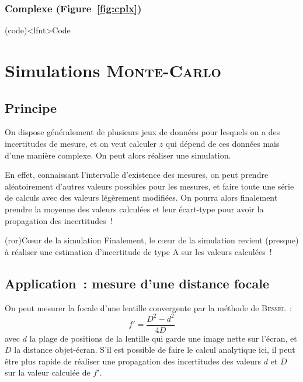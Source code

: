\documentclass[a4paper, 12pt, garamond]{book}
\begin{document}
\subsubsection{Complexe (Figure~\ref{fig:cplx})}
\begin{tcb}[breakable](code)<lfnt>{Code}
\end{tcb}

\section{Simulations \textsc{Monte-Carlo}}
\subsection{Principe}
On dispose généralement de plusieurs jeux de données pour
lesquels on a des incertitudes de mesure, et on veut calculer $z$ qui dépend de
ces données mais d'une manière complexe. On peut alors réaliser une simulation.

En effet, connaissant l'intervalle d'existence des mesures, on peut prendre
aléatoirement d'autres valeurs possibles pour les mesures, et faire toute une
série de calculs avec des valeurs légèrement modifiées. On pourra alors
finalement prendre la moyenne des valeurs calculées et leur écart-type pour
avoir la propagation des incertitudes~!

\begin{tcb}(ror){Cœur de la simulation}
	Finalement, le cœur de la simulation revient (presque) à réaliser une estimation
	d'incertitude de type A sur les valeurs calculées~!
\end{tcb}

\subsection{Application~: mesure d'une distance focale}
On peut mesurer la focale d'une lentille convergente par la méthode de
\textsc{Bessel}~:
\[
	\boxed{f' = \frac{D^{2}-d^{2}}{4D}}
\]
avec $d$ la plage de positions de la lentille qui garde une image nette sur
l'écran, et $D$ la distance objet-écran. S'il est possible de faire le calcul
analytique ici, il peut être plus rapide de réaliser une propagation des
incertitudes des valeurs $d$ et $D$ sur la valeur calculée de $f'$.
\end{document}
